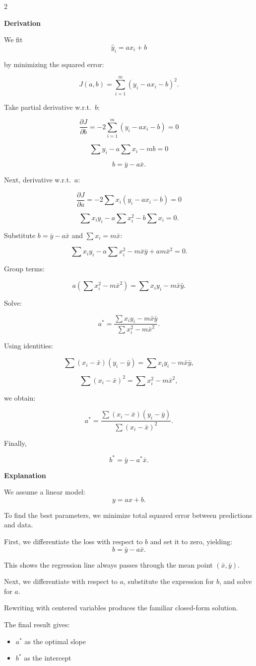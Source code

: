 \documentclass[11pt]{article}
\begin{document}
\begin{multicols}{2}

\textbf{Derivation}

We fit
\[
\hat y_i = ax_i + b
\]

by minimizing the squared error:

\[
J(a,b)=\sum_{i=1}^m (y_i-ax_i-b)^2.
\]

Take partial derivative w.r.t.\ $b$:

\[
\frac{\partial J}{\partial b}
=
-2\sum_{i=1}^m (y_i-ax_i-b)=0
\]

\[
\sum y_i-a\sum x_i-mb=0
\]

\[
b=\bar y-a\bar x.
\]

Next, derivative w.r.t.\ $a$:

\[
\frac{\partial J}{\partial a}
=
-2\sum x_i(y_i-ax_i-b)=0
\]

\[
\sum x_i y_i-a\sum x_i^2-b\sum x_i=0.
\]

Substitute $b=\bar y-a\bar x$ and $\sum x_i=m\bar x$:

\[
\sum x_i y_i-a\sum x_i^2-m\bar x\bar y+am\bar x^2=0.
\]

Group terms:

\[
a(\sum x_i^2-m\bar x^2)=\sum x_i y_i-m\bar x\bar y.
\]

Solve:

\[
a^*=
\frac{\sum x_i y_i-m\bar x\bar y}
{\sum x_i^2-m\bar x^2}.
\]

Using identities:

\[
\sum(x_i-\bar x)(y_i-\bar y)=\sum x_i y_i-m\bar x\bar y,
\]

\[
\sum(x_i-\bar x)^2=\sum x_i^2-m\bar x^2,
\]

we obtain:

\[
a^*=\frac{\sum (x_i-\bar x)(y_i-\bar y)}
{\sum (x_i-\bar x)^2}.
\]

Finally,

\[
b^*=\bar y-a^*\bar x.
\]

\columnbreak

\textbf{Explanation}

We assume a linear model:
\[
y=ax+b.
\]

To find the best parameters, we minimize total squared error between predictions and data.

First, we differentiate the loss with respect to $b$ and set it to zero, yielding:
\[
b=\bar y-a\bar x.
\]

This shows the regression line always passes through the mean point $(\bar x,\bar y)$.

Next, we differentiate with respect to $a$, substitute the expression for $b$, and solve for $a$.

Rewriting with centered variables produces the familiar closed-form solution.

The final result gives:

\begin{itemize}
\item $a^*$ as the optimal slope
\item $b^*$ as the intercept
\end{itemize}

\end{multicols}
\end{document}
